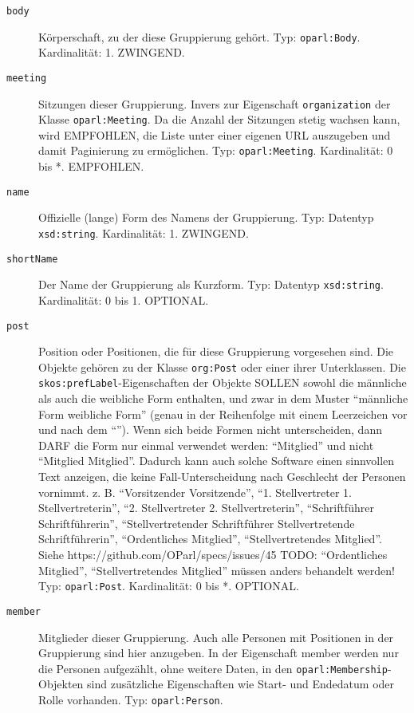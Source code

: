 \documentclass[,a4paper]{article}
\begin{document}
\begin{description}
\item[\texttt{body}]
Körperschaft, zu der diese Gruppierung gehört. Typ: \texttt{oparl:Body}.
Kardinalität: 1. ZWINGEND.
\item[\texttt{meeting}]
Sitzungen dieser Gruppierung. Invers zur Eigenschaft
\texttt{organization} der Klasse \texttt{oparl:Meeting}. Da die Anzahl
der Sitzungen stetig wachsen kann, wird EMPFOHLEN, die Liste unter einer
eigenen URL auszugeben und damit Paginierung zu ermöglichen. Typ:
\texttt{oparl:Meeting}. Kardinalität: 0 bis *. EMPFOHLEN.
\item[\texttt{name}]
Offizielle (lange) Form des Namens der Gruppierung. Typ: Datentyp
\texttt{xsd:string}. Kardinalität: 1. ZWINGEND.
\item[\texttt{shortName}]
Der Name der Gruppierung als Kurzform. Typ: Datentyp
\texttt{xsd:string}. Kardinalität: 0 bis 1. OPTIONAL.
\item[\texttt{post}]
Position oder Positionen, die für diese Gruppierung vorgesehen sind. Die
Objekte gehören zu der Klasse \texttt{org:Post} oder einer ihrer
Unterklassen. Die \texttt{skos:prefLabel}-Eigenschaften der Objekte
SOLLEN sowohl die männliche als auch die weibliche Form enthalten, und
zwar in dem Muster ``männliche Form \textbar{} weibliche Form'' (genau
in der Reihenfolge mit einem Leerzeichen vor und nach dem
``\textbar{}''). Wenn sich beide Formen nicht unterscheiden, dann DARF
die Form nur einmal verwendet werden: ``Mitglied'' und nicht ``Mitglied
\textbar{} Mitglied''. Dadurch kann auch solche Software einen
sinnvollen Text anzeigen, die keine Fall-Unterscheidung nach Geschlecht
der Personen vornimmt. z. B. ``Vorsitzender \textbar{} Vorsitzende'',
``1. Stellvertreter \textbar{} 1. Stellvertreterin'', ``2.
Stellvertreter \textbar{} 2. Stellvertreterin'', ``Schriftführer
\textbar{} Schriftführerin'', ``Stellvertretender Schriftführer
\textbar{} Stellvertretende Schriftführerin'', ``Ordentliches
Mitglied'', ``Stellvertretendes Mitglied''. Siehe
https://github.com/OParl/specs/issues/45 TODO: ``Ordentliches
Mitglied'', ``Stellvertretendes Mitglied'' müssen anders behandelt
werden! Typ: \texttt{oparl:Post}. Kardinalität: 0 bis *. OPTIONAL.
\item[\texttt{member}]
Mitglieder dieser Gruppierung. Auch alle Personen mit Positionen in der
Gruppierung sind hier anzugeben. In der Eigenschaft member werden nur
die Personen aufgezählt, ohne weitere Daten, in den
\texttt{oparl:Membership}-Objekten sind zusätzliche Eigenschaften wie
Start- und Endedatum oder Rolle vorhanden. Typ: \texttt{oparl:Person}.

\end{description}
\end{document}
